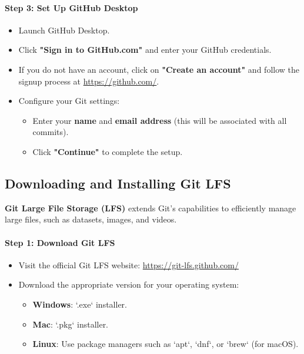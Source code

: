 \paragraph{Step 3: Set Up GitHub Desktop}
\begin{itemize}
    \item Launch GitHub Desktop.
    \item Click \textbf{"Sign in to GitHub.com"} and enter your GitHub credentials.
    \item If you do not have an account, click on \textbf{"Create an account"} and follow the signup process at \url{https://github.com/}.
    \item Configure your Git settings:
    \begin{itemize}
        \item Enter your \textbf{name} and \textbf{email address} (this will be associated with all commits).
        \item Click \textbf{"Continue"} to complete the setup.
    \end{itemize}
\end{itemize}

\subsection{Downloading and Installing Git LFS}
\textbf{Git Large File Storage (LFS)} extends Git’s capabilities to efficiently manage large files, such as datasets, images, and videos.

\paragraph{Step 1: Download Git LFS}
\begin{itemize}
    \item Visit the official Git LFS website: \url{https://git-lfs.github.com/}
    \item Download the appropriate version for your operating system:
    \begin{itemize}
        \item \textbf{Windows}: `.exe` installer.
        \item \textbf{Mac}: `.pkg` installer.
        \item \textbf{Linux}: Use package managers such as `apt`, `dnf`, or `brew` (for macOS).
    \end{itemize}
\end{itemize}

